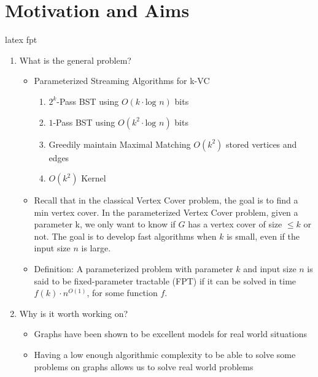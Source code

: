 \section{\wip Motivation and Aims}

\gls{latex}
\acrshort{fpt}

\begin{enumerate}
    \item What is the general problem?
    \begin{itemize}
        \item Parameterized Streaming Algorithms for k-VC
        \begin{enumerate}
            \item $2^k$-Pass BST using $O(k \cdot \text{log } n)$ bits
            \item $1$-Pass BST using $O(k^2 \cdot \text{log } n)$ bits
            \item Greedily maintain Maximal Matching $O(k^2)$ stored vertices and edges
            \item $O(k^2)$ Kernel
        \end{enumerate}
        \item {}Recall that in the classical Vertex Cover problem, the goal is to find a min vertex cover. In the parameterized Vertex Cover problem, given a parameter k, we only want to know if $G$ has a vertex cover of size $\leq k$ or not. The goal is to develop fast algorithms when $k$ is small, even if the input size $n$ is large.
        \item Definition: A parameterized problem with parameter $k$ and input size $n$ is said to be fixed-parameter tractable (FPT) if it can be solved in time $f(k) \cdot n^{O(1)}$, for some function $f$.
    \end{itemize}
    \item Why is it worth working on?
    \begin{itemize}
        \item Graphs have been shown to be excellent models for real world situations
        \item Having a low enough algorithmic complexity to be able to solve some problems on graphs allows us to solve real world problems

\end{itemize}
\end{enumerate}
